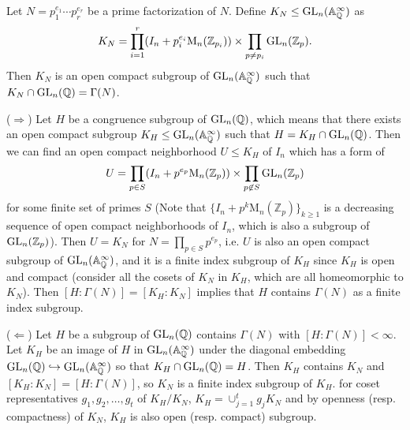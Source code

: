 \begin{problem}
Let $N = p_{1}^{e_{1}}\cdots p_{r}^{e_r}$ be a prime factorization of $N$. Define $K_N \leq \operatorname{\mathrm{GL}}_{n}(\mathbb{A}_{\mathbb{Q}}^{\infty})$ as
$$
K_N = \prod_{i=1}^{r} (I_{n} + p_{i}^{e_{i}}\mathrm{M}_n(\mathbb{Z}_{p_i})) \times  \prod_{p \neq p_{i}} \operatorname{\mathrm{GL}}_{n}(\mathbb{Z}_p).
$$
Then $K_N$ is an open compact subgroup of $\operatorname{\mathrm{GL}}_{n}(\mathbb{A}_{\mathbb{Q}}^{\infty})$ such that $K_N \cap \operatorname{\mathrm{GL}}_{n}(\mathbb{Q}) = \Gamma(N)$.

($\Rightarrow$) Let $H$ be a congruence subgroup of $\operatorname{\mathrm{GL}}_{n}(\mathbb{Q})$, which means that there exists an open compact subgroup $K_H \leq \operatorname{\mathrm{GL}}_{n}(\mathbb{A}_{\mathbb{Q}}^{\infty})$
such that $H = K_H \cap \operatorname{\mathrm{GL}}_{n}(\mathbb{Q})$.
Then we can find an open compact neighborhood $U \leq K_H$ of $I_n$  which has a form of
$$
U = \prod_{p\in S} (I_n + p^{e_p}\mathrm{M}_n(\mathbb{Z}_p)) \times \prod_{p \not \in S} \operatorname{\mathrm{GL}}_n(\mathbb{Z}_p)
$$
for some finite set of primes $S$ (Note that $\{I_n + p^{k}\mathrm{M}_{n}(\mathbb{Z}_{p})\}_{k\geq 1}$ is a decreasing sequence of open compact neighborhoods of $I_n$, which is also a subgroup of $\operatorname{\mathrm{GL}}_{n}(\mathbb{Z}_p)$).
Then $U = K_N$ for $N = \prod_{p \in S}p^{e_p}$, i.e. $U$ is also an open compact subgroup of $\operatorname{\mathrm{GL}}_{n}(\mathbb{A}_{\mathbb{Q}}^{\infty})$, and it is a finite index subgroup of $K_H$
since $K_H$ is open and compact (consider all the cosets of $K_N$ in $K_H$, which are all homeomorphic to $K_N$).
Then $[H: \Gamma(N)] = [K_H: K_N]$ implies that $H$ contains $\Gamma(N)$ as a finite index subgroup.

($\Leftarrow$) 
Let $H$ be a subgroup of $\operatorname{\mathrm{GL}}_{n}(\mathbb{Q})$ contains $\Gamma(N)$ with $[H:\Gamma(N)] < \infty$.
Let $K_H$ be an image of $H$ in $\operatorname{\mathrm{GL}}_{n}(\mathbb{A}_{\mathbb{Q}}^{\infty})$ under the diagonal embedding $\operatorname{\mathrm{GL}}_{n}(\mathbb{Q}) \hookrightarrow \operatorname{\mathrm{GL}}_{n}(\mathbb{A}_{\mathbb{Q}}^{\infty})$
so that $K_H \cap \operatorname{\mathrm{GL}}_{n}(\mathbb{Q}) = H$.
Then $K_H$ contains $K_N$ and $[K_H: K_N] = [H:\Gamma(N)]$, so $K_N$ is a finite index subgroup of $K_H$.
for coset representatives $g_{1}, g_{2}, \dots, g_{t}$ of $K_{H} / K_{N}$, $K_{H} = \cup_{j=1}^{t} g_{j}K_{N}$ and by openness (resp. compactness) of $K_N$, $K_H$ is also open (resp. compact) subgroup.

\end{problem}
